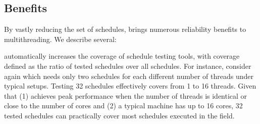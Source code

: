 




\subsection{Benefits}

By vastly reducing the set of schedules, \smt brings numerous reliability benefits
to multithreading.  We describe several:

 \smt automatically
increases the coverage of schedule testing tools, with coverage
defined as the ratio of tested schedules over all schedules.
For instance, consider \pbzip again which needs only two
schedules for each different number of threads under typical setups.  Testing 32 schedules effectively covers from
1 to 16 threads.  Given that (1) \pbzip achieves peak performance when the
number of threads is identical or close to the number of cores
and (2) a typical machine has up to 16 cores, 32 tested schedules can
practically cover most schedules executed in the field.

